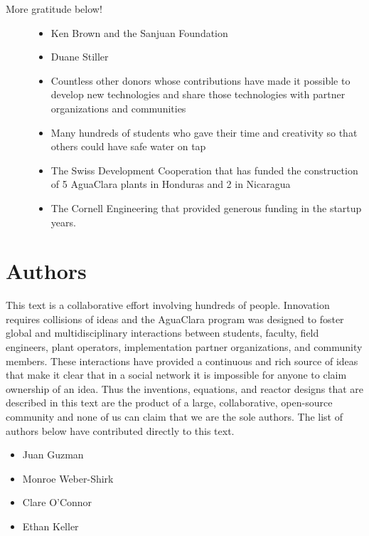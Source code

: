 \documentclass[letterpaper,10pt,english]{sphinxmanual}
\begin{document}
\begin{description}
\item[{More gratitude below!}] \leavevmode\begin{itemize}
\item {} 
Ken Brown and the Sanjuan Foundation

\item {} 
Duane Stiller

\item {} 
Countless other donors whose contributions have made it possible to develop new technologies and share those technologies with partner organizations and communities

\item {} 
Many hundreds of students who gave their time and creativity so that others could have safe water on tap

\item {} 
The Swiss Development Cooperation that has funded the construction of 5 AguaClara plants in Honduras and 2 in Nicaragua

\item {} 
The Cornell Engineering that provided generous funding in the startup years.

\end{itemize}

\end{description}


\chapter{Authors}
\label{\detokenize{Authors:authors}}\label{\detokenize{Authors:title-authors}}\label{\detokenize{Authors::doc}}
This text is a collaborative effort involving hundreds of people. Innovation requires collisions of ideas and the AguaClara program was designed to foster global and multidisciplinary interactions between students, faculty, field engineers, plant operators, implementation partner organizations, and community members. These interactions have provided a continuous and rich source of ideas that make it clear that in a social network it is impossible for anyone to claim ownership of an idea. Thus the inventions, equations, and reactor designs that are described in this text are the product of a large, collaborative, open-source community and none of us can claim that we are the sole authors. The list of authors below have contributed directly to this text.
\begin{itemize}
\item {} 
Juan Guzman

\item {} 
Monroe Weber-Shirk

\item {} 
Clare O’Connor

\item {} 
Ethan Keller

\end{itemize}
\end{document}
